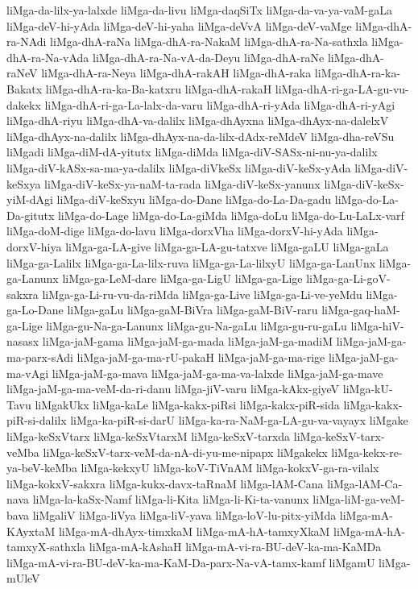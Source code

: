 {liMga-da-lilx-ya-lalxde
liMga-da-livu
liMga-daqSiTx
liMga-da-va-ya-vaM-gaLa
liMga-deV-hi-yAda
liMga-deV-hi-yaha
liMga-deVvA
liMga-deV-vaMge
liMga-dhA-ra-NAdi
liMga-dhA-raNa
liMga-dhA-ra-NakaM
liMga-dhA-ra-Na-sathxla
liMga-dhA-ra-Na-vAda
liMga-dhA-ra-Na-vA-da-Deyu
liMga-dhA-raNe
liMga-dhA-raNeV
liMga-dhA-ra-Neya
liMga-dhA-rakAH
liMga-dhA-raka
liMga-dhA-ra-ka-Bakatx
liMga-dhA-ra-ka-Ba-katxru
liMga-dhA-rakaH
liMga-dhA-ri-ga-LA-gu-vu-dakekx
liMga-dhA-ri-ga-La-lalx-da-varu
liMga-dhA-ri-yAda
liMga-dhA-ri-yAgi
liMga-dhA-riyu
liMga-dhA-va-dalilx
liMga-dhAyxna
liMga-dhAyx-na-dalelxV
liMga-dhAyx-na-dalilx
liMga-dhAyx-na-da-lilx-dAdx-reMdeV
liMga-dha-reVSu
liMgadi
liMga-diM-dA-yitutx
liMga-diMda
liMga-diV-SASx-ni-nu-ya-dalilx
liMga-diV-kASx-sa-ma-ya-dalilx
liMga-diVkeSx
liMga-diV-keSx-yAda
liMga-diV-keSxya
liMga-diV-keSx-ya-naM-ta-rada
liMga-diV-keSx-yanunx
liMga-diV-keSx-yiM-dAgi
liMga-diV-keSxyu
liMga-do-Dane
liMga-do-La-Da-gadu
liMga-do-La-Da-gitutx
liMga-do-Lage
liMga-do-La-giMda
liMga-doLu
liMga-do-Lu-LaLx-varf
liMga-doM-dige
liMga-do-lavu
liMga-dorxVha
liMga-dorxV-hi-yAda
liMga-dorxV-hiya
liMga-ga-LA-give
liMga-ga-LA-gu-tatxve
liMga-gaLU
liMga-gaLa
liMga-ga-Lalilx
liMga-ga-La-lilx-ruva
liMga-ga-La-lilxyU
liMga-ga-LanUnx
liMga-ga-Lanunx
liMga-ga-LeM-dare
liMga-ga-LigU
liMga-ga-Lige
liMga-ga-Li-goV-sakxra
liMga-ga-Li-ru-vu-da-riMda
liMga-ga-Live
liMga-ga-Li-ve-yeMdu
liMga-ga-Lo-Dane
liMga-gaLu
liMga-gaM-BiVra
liMga-gaM-BiV-raru
liMga-gaq-haM-ga-Lige
liMga-gu-Na-ga-Lanunx
liMga-gu-Na-gaLu
liMga-gu-ru-gaLu
liMga-hiV-nasasx
liMga-jaM-gama
liMga-jaM-ga-mada
liMga-jaM-ga-madiM
liMga-jaM-ga-ma-parx-sAdi
liMga-jaM-ga-ma-rU-pakaH
liMga-jaM-ga-ma-rige
liMga-jaM-ga-ma-vAgi
liMga-jaM-ga-mava
liMga-jaM-ga-ma-va-lalxde
liMga-jaM-ga-mave
liMga-jaM-ga-ma-veM-da-ri-danu
liMga-jiV-varu
liMga-kAkx-giyeV
liMga-kU-Tavu
liMgakUkx
liMga-kaLe
liMga-kakx-piRsi
liMga-kakx-piR-sida
liMga-kakx-piR-si-dalilx
liMga-ka-piR-si-darU
liMga-ka-ra-NaM-ga-LA-gu-va-vayayx
liMgake
liMga-keSxVtarx
liMga-keSxVtarxM
liMga-keSxV-tarxda
liMga-keSxV-tarx-veMba
liMga-keSxV-tarx-veM-da-nA-di-yu-me-nipapx
liMgakekx
liMga-kekx-re-ya-beV-keMba
liMga-kekxyU
liMga-koV-TiVnAM
liMga-kokxV-ga-ra-vilalx
liMga-kokxV-sakxra
liMga-kukx-davx-taRnaM
liMga-lAM-Cana
liMga-lAM-Ca-nava
liMga-la-kaSx-Namf
liMga-li-Kita
liMga-li-Ki-ta-vanunx
liMga-liM-ga-veM-bava
liMgaliV
liMga-liVya
liMga-liV-yava
liMga-loV-lu-pitx-yiMda
liMga-mA-KAyxtaM
liMga-mA-dhAyx-timxkaM
liMga-mA-hA-tamxyXkaM
liMga-mA-hA-tamxyX-sathxla
liMga-mA-kAshaH
liMga-mA-vi-ra-BU-deV-ka-ma-KaMDa
liMga-mA-vi-ra-BU-deV-ka-ma-KaM-Da-parx-Na-vA-tamx-kamf
liMgamU
liMga-mUleV
}

